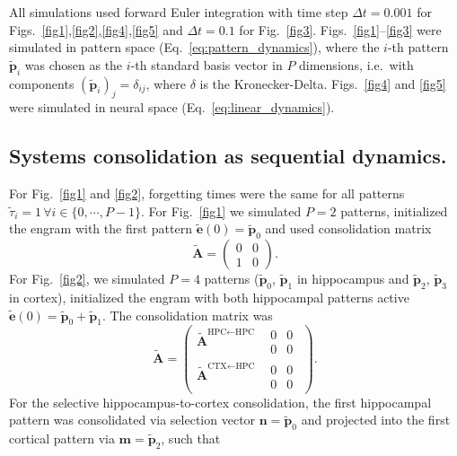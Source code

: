 All simulations used forward Euler integration with time step $\Delta t = 0.001$ for Figs.~\ref{fig1},\ref{fig2},\ref{fig4},\ref{fig5} and $\Delta t = 0.1$ for Fig.~\ref{fig3}. Figs.~\ref{fig1}--\ref{fig3} were simulated in pattern space (Eq.~\ref{eq:pattern_dynamics}), where the $i$-th pattern $\mathbf{\tilde{p}}_i$ was chosen as the $i$-th standard basis vector in $P$ dimensions, i.e.~with components $(\mathbf{\tilde{p}}_i)_j = \delta_{ij}$, where $\delta$ is the Kronecker-Delta. Figs.~\ref{fig4} and \ref{fig5} were simulated in neural space (Eq.~\ref{eq:linear_dynamics}).

\subsection{Systems consolidation as sequential dynamics.}
For Fig.~\ref{fig1} and \ref{fig2}, forgetting times were the same for all patterns $\tilde{\tau}_i = 1 \, \forall i \in \{0, \cdots, P-1\}$. For Fig.~\ref{fig1} we simulated $P = 2$ patterns, initialized the engram with the first pattern $\mathbf{\tilde{e}}(0) = \mathbf{\tilde{p}}_0$ and used consolidation matrix
\begin{equation}
  \mathbf{\tilde{A}} = \begin{pmatrix}
    0 & 0
    \\
    1 & 0
  \end{pmatrix}.
\end{equation}
For Fig.~\ref{fig2}, we simulated $P=4$ patterns ($\mathbf{\tilde{p}}_0$, $\mathbf{\tilde{p}}_1$ in hippocampus and $\mathbf{\tilde{p}}_2$, $\mathbf{\tilde{p}}_3$ in cortex), initialized the engram with both hippocampal patterns active $\mathbf{\tilde{e}}(0) = \mathbf{\tilde{p}}_0 + \mathbf{\tilde{p}}_1$. The consolidation matrix was
\begin{equation}
  \mathbf{\tilde{A}} = \begin{pmatrix}
    \mathbf{\tilde{A}}^{\text{HPC} \leftarrow \text{HPC}} & \begin{matrix} 0 & 0 \\ 0 & 0 \end{matrix}
    \\
    \mathbf{\tilde{A}}^{\text{CTX} \leftarrow \text{HPC}} & \begin{matrix} 0 & 0 \\ 0 & 0 \end{matrix}
  \end{pmatrix}.
\end{equation}
For the selective hippocampus-to-cortex consolidation, the first hippocampal pattern was consolidated via selection vector $\mathbf{n} = \mathbf{\tilde{p}}_0$ and projected into the first cortical pattern via $\mathbf{m} = \mathbf{\tilde{p}}_2$, such that
